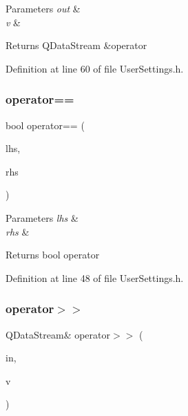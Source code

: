 \begin{DoxyParams}{Parameters}
{\em out} & \\
\hline
{\em v} & \\
\hline
\end{DoxyParams}
\begin{DoxyReturn}{Returns}
Q\+Data\+Stream \&operator 
\end{DoxyReturn}


Definition at line 60 of file User\+Settings.\+h.

\mbox{\label{structvolume_info_a4c2860a6e40222e89edc0c2b0cff7ceb}} 
\subsubsection{\texorpdfstring{operator==}{operator==}}
{\footnotesize\ttfamily bool operator== (\begin{DoxyParamCaption}\item[{const \hyperlink{structvolume_info}{volume\+Info} \&}]{lhs,  }\item[{const \hyperlink{structvolume_info}{volume\+Info} \&}]{rhs }\end{DoxyParamCaption})\hspace{0.3cm}{\ttfamily [friend]}}


\begin{DoxyParams}{Parameters}
{\em lhs} & \\
\hline
{\em rhs} & \\
\hline
\end{DoxyParams}
\begin{DoxyReturn}{Returns}
bool operator 
\end{DoxyReturn}


Definition at line 48 of file User\+Settings.\+h.

\mbox{\label{structvolume_info_a798abc6a677bf3fd11596df68549bdaf}} 
\subsubsection{\texorpdfstring{operator$>$$>$}{operator>>}}
{\footnotesize\ttfamily Q\+Data\+Stream\& operator$>$$>$ (\begin{DoxyParamCaption}\item[{Q\+Data\+Stream \&}]{in,  }\item[{\hyperlink{structvolume_info}{volume\+Info} \&}]{v }\end{DoxyParamCaption})\hspace{0.3cm}{\ttfamily [friend]}}


